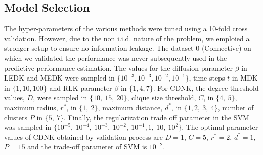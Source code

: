 \documentclass[review]{elsarticle}
\begin{document}
\subsection{Model Selection}
The hyper-parameters of the various methods were tuned using a 10-fold cross validation. However, due to the non i.i.d. nature of the problem, we emploied a stronger setup to ensure no information leakage. The dataset $0$ (Connective) on which we  validated the performance was never subsequently used in the predictive performance estimation. The values for the diffusion parameter $\beta$ in LEDK and MEDK were sampled in $\lbrace 10^{-3}, 10^{-3}, 10^{-2}, 10^{-1} \rbrace$, time steps $t$ in MDK in $\lbrace 1, 10, 100 \rbrace$ and RLK parameter $\beta$ in $\lbrace 1, 4, 7 \rbrace$. For CDNK, the degree threshold values, $D$, were sampled in $\lbrace 10,\ 15,\ 20 \rbrace$, clique size threshold, $C$, in $\lbrace 4,\ 5 \rbrace$, maximum radius, $r^*$, in $\lbrace 1,\ 2 \rbrace$, maximum distance, $d^*$, in $\lbrace 1, 2,\ 3,\ 4 \rbrace$, number of clusters $P$ in $\lbrace 5,\ 7 \rbrace$. Finally, the regularization trade off parameter in the SVM was sampled in $\lbrace 10^{-5},  \ 10^{-4}, \ 10^{-3},\ 10^{-2},\ 10^{-1}, 1,\ 10,\ 10^2 \rbrace$. The optimal parameter values of CDNK obtained by validation process are $D = 1$, $C=5$, $r^*=2$, $d^*=1$, $P=15$ and the trade-off parameter of SVM is $10^{-2}$.
\end{document}
